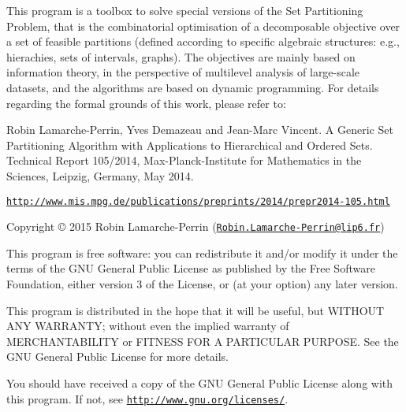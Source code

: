 This program is a toolbox to solve special versions of the Set Partitioning Problem, that is the combinatorial optimisation of a decomposable objective over a set of feasible partitions (defined according to specific algebraic structures\-: e.\-g., hierachies, sets of intervals, graphs). The objectives are mainly based on information theory, in the perspective of multilevel analysis of large-\/scale datasets, and the algorithms are based on dynamic programming. For details regarding the formal grounds of this work, please refer to\-:

Robin Lamarche-\/\-Perrin, Yves Demazeau and Jean-\/\-Marc Vincent. A Generic Set Partitioning Algorithm with Applications to Hierarchical and Ordered Sets. Technical Report 105/2014, Max-\/\-Planck-\/\-Institute for Mathematics in the Sciences, Leipzig, Germany, May 2014.

\href{http://www.mis.mpg.de/publications/preprints/2014/prepr2014-105.html}{\tt http\-://www.\-mis.\-mpg.\-de/publications/preprints/2014/prepr2014-\/105.\-html}

Copyright © 2015 Robin Lamarche-\/\-Perrin (\href{mailto:Robin.Lamarche-Perrin@lip6.fr}{\tt Robin.\-Lamarche-\/\-Perrin@lip6.\-fr})

This program is free software\-: you can redistribute it and/or modify it under the terms of the G\-N\-U General Public License as published by the Free Software Foundation, either version 3 of the License, or (at your option) any later version.

This program is distributed in the hope that it will be useful, but W\-I\-T\-H\-O\-U\-T A\-N\-Y W\-A\-R\-R\-A\-N\-T\-Y; without even the implied warranty of M\-E\-R\-C\-H\-A\-N\-T\-A\-B\-I\-L\-I\-T\-Y or F\-I\-T\-N\-E\-S\-S F\-O\-R A P\-A\-R\-T\-I\-C\-U\-L\-A\-R P\-U\-R\-P\-O\-S\-E. See the G\-N\-U General Public License for more details.

You should have received a copy of the G\-N\-U General Public License along with this program. If not, see \href{http://www.gnu.org/licenses/}{\tt http\-://www.\-gnu.\-org/licenses/}. 